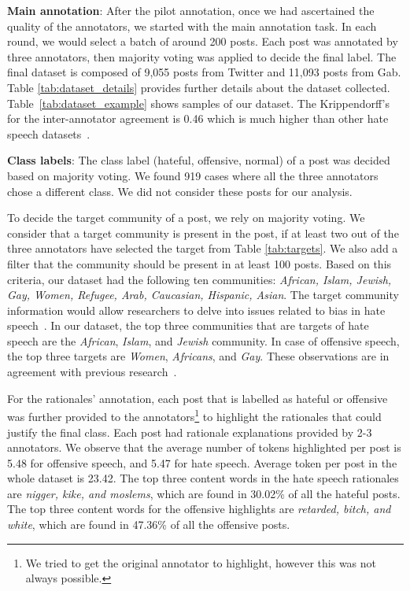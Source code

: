 \documentclass[letterpaper]{article} \usepackage{aaai21}  \usepackage{times}  \usepackage{helvet} \usepackage{courier}  \usepackage[hyphens]{url}  \usepackage{graphicx} \urlstyle{rm} \def\UrlFont{\rm}  \usepackage{natbib}  \usepackage{caption}
\begin{document}
\noindent\textbf{Main annotation}: After the pilot annotation, once we had ascertained the quality of the annotators, we started with the main annotation task. In each round, we would select a batch of around 200 posts. Each post was annotated by three annotators, then majority voting was applied to decide the final label. The final dataset is composed of 9,055 posts from Twitter and 11,093 posts from Gab. Table \ref{tab:dataset_details} provides further details about the dataset collected. Table~\ref{tab:dataset_example} shows samples of our dataset. The Krippendorff's  for the inter-annotator agreement is 0.46 which is much higher than other hate speech datasets~\cite{del2017hate,ousidhoum2019multilingual}.



\noindent\textbf{Class labels}: The class label (hateful, offensive, normal) of a post was decided based on majority voting. We found 919 cases where all the three annotators chose a different class. We did not consider these posts for our analysis. 

To decide the target community of a post, we rely on majority voting. We consider that a target community is present in the post, if at least two out of the three annotators have selected the target from Table \ref{tab:targets}. We also add a filter that the community should be present in at least 100 posts. Based on this criteria, our dataset had the following ten communities: \textit{African, Islam, Jewish, Gay, Women, Refugee, Arab, Caucasian, Hispanic, Asian}. The target community information would allow researchers to delve into issues related to bias in hate speech~\cite{davidson2019racial}. In our dataset, the top three communities that are targets of hate speech are the \textit{African}, \textit{Islam}, and \textit{Jewish} community. In case of offensive speech, the top three targets are \textit{Women}, \textit{Africans}, and \textit{Gay}. These observations are in agreement with previous research~\cite{silva2016analyzing}.

For the rationales' annotation, each post that is labelled as hateful or offensive was further provided to the annotators\footnote{We tried to get the original annotator to highlight, however this was not always possible.} to highlight the rationales that could justify the final class. Each post had rationale explanations provided by 2-3 annotators. We observe that the average number of tokens highlighted per post is 5.48 for offensive speech, and 5.47 for hate speech. Average token per post in the whole dataset is 23.42. The top three content words in the hate speech rationales are \textit{nigger, kike, and moslems}, which are found in 30.02\% of all the hateful posts. The top three content words for the offensive highlights are \textit{retarded, bitch, and white}, which are found in 47.36\% of all the offensive posts. 
\end{document}
